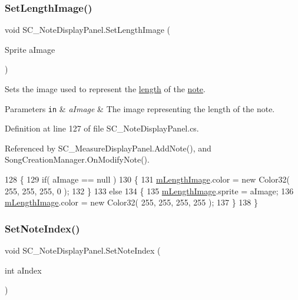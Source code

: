 \subsubsection{\texorpdfstring{Set\+Length\+Image()}{SetLengthImage()}}
{\footnotesize\ttfamily void S\+C\+\_\+\+Note\+Display\+Panel.\+Set\+Length\+Image (\begin{DoxyParamCaption}\item[{Sprite}]{a\+Image }\end{DoxyParamCaption})}



Sets the image used to represent the \hyperlink{group___music_enums_gaf11b5f079adbb21c800b9eca1c5c3cbd}{length} of the \hyperlink{group___music_structs_struct_music_1_1_combined_note}{note}. 


\begin{DoxyParams}[1]{Parameters}
\mbox{\tt in}  & {\em a\+Image} & The image representing the length of the note. \\
\hline
\end{DoxyParams}


Definition at line 127 of file S\+C\+\_\+\+Note\+Display\+Panel.\+cs.



Referenced by S\+C\+\_\+\+Measure\+Display\+Panel.\+Add\+Note(), and Song\+Creation\+Manager.\+On\+Modify\+Note().


\begin{DoxyCode}
128     \{
129         \textcolor{keywordflow}{if}( aImage == null )
130         \{
131             \hyperlink{group___s_c___n_d_p_priv_var_ga611f26eaf6a960570b0dd848b6712b5f}{mLengthImage}.color = \textcolor{keyword}{new} Color32( 255, 255, 255, 0 );
132         \}
133         \textcolor{keywordflow}{else}
134         \{
135             \hyperlink{group___s_c___n_d_p_priv_var_ga611f26eaf6a960570b0dd848b6712b5f}{mLengthImage}.sprite = aImage;
136             \hyperlink{group___s_c___n_d_p_priv_var_ga611f26eaf6a960570b0dd848b6712b5f}{mLengthImage}.color = \textcolor{keyword}{new} Color32( 255, 255, 255, 255 );
137         \}
138     \}
\end{DoxyCode}
\mbox{\label{group___s_c___n_d_p_unity_gaf3160e3686e44e7718768242438ea1cc}} 
\subsubsection{\texorpdfstring{Set\+Note\+Index()}{SetNoteIndex()}}
{\footnotesize\ttfamily void S\+C\+\_\+\+Note\+Display\+Panel.\+Set\+Note\+Index (\begin{DoxyParamCaption}\item[{int}]{a\+Index }\end{DoxyParamCaption})}



